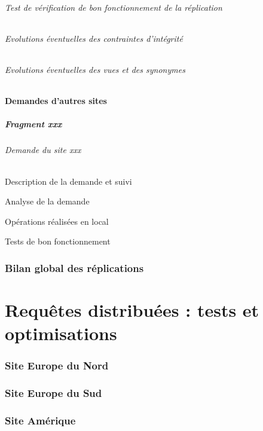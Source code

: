 \documentclass[10pt,a4paper,twoside]{article}
\begin{document}
\paragraph{Test de vérification de bon fonctionnement de la réplication}
\paragraph{Evolutions éventuelles des contraintes d'intégrité}
\paragraph{Evolutions éventuelles des vues et des synonymes}
\subsection{Demandes d'autres sites}
\subsubsection{Fragment xxx}
\paragraph{Demande du site xxx}
\subparagraph{Description de la demande et suivi}
\subparagraph{Analyse de la demande}
\subparagraph{Opérations réalisées en local}
\subparagraph{Tests de bon fonctionnement}
\section{Bilan global des réplications}

\newpage
\part{Requêtes distribuées : tests et optimisations}
\section{Site Europe du Nord}
\section{Site Europe du Sud}
\section{Site Amérique}
\end{document}
